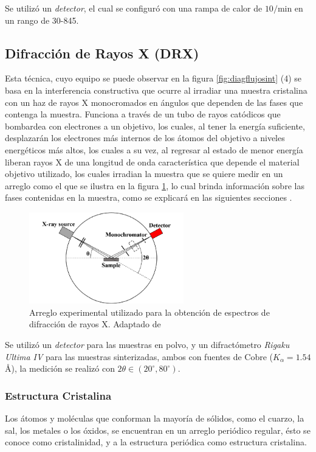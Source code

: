 \documentclass[../main.tex]{subfiles}
\begin{document}
Se utilizó un \textit{detector}, el cual se configuró con una rampa de calor de $10$\gradoC{}$/$min en un rango de 30\gradoC{}-845\gradoC{}.
\subsection{Difracción de Rayos X (DRX)}
Esta técnica, cuyo equipo se puede observar en la figura \ref{fig:diagflujosint} (4) se basa en la interferencia constructiva que ocurre al irradiar una muestra cristalina con un haz de rayos X monocromados en ángulos que dependen de las fases que contenga la muestra. Funciona a través de un tubo de rayos catódicos que bombardea con electrones a un objetivo, los cuales, al tener la energía suficiente, desplazarán los electrones más internos de los átomos del objetivo a niveles energéticos más altos, los cuales a su vez, al regresar al estado de menor energía liberan rayos X de una longitud de onda característica que depende el material objetivo utilizado, los cuales irradian la muestra que se quiere medir en un arreglo como el que se ilustra en la figura \ref{fig:diagDRX}, lo cual brinda información sobre las fases contenidas en la muestra, como se explicará en las siguientes secciones \cite{dutrowxrd}.
\begin{figure}[H]
    \centering
    \includegraphics[width=0.6\textwidth]{fig/DRXdiag.png}
    \caption{Arreglo experimental utilizado para la obtención de espectros de difracción de rayos X. Adaptado de \cite{Jung2023}}
    \label{fig:diagDRX}
\end{figure}

Se utilizó un \textit{detector} para las muestras en polvo, y un  difractómetro \textit{Rigaku Ultima IV} para las muestras sinterizadas, ambos con fuentes de Cobre ($K_\alpha=1.54$ \r{A}), la medición se realizó con $2\theta\in(20^\circ,80^\circ)$.
\subsubsection{Estructura Cristalina}
Los átomos y moléculas que conforman la mayoría de sólidos, como el cuarzo, la sal, los metales o los óxidos, se encuentran en un arreglo periódico regular, ésto se conoce como cristalinidad, y a la estructura periódica como estructura cristalina.
\end{document}
